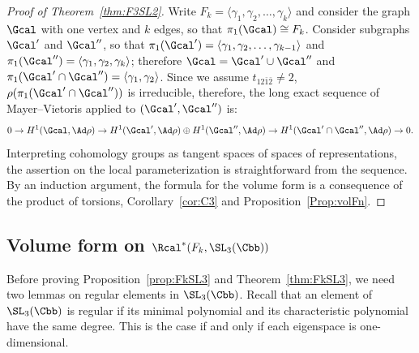 \begin{proof}[Proof of Theorem~\ref{thm:F3SL2}]
Write $F_k=\langle\gamma_1,\gamma_2,\dots,\gamma_k\rangle$ and consider the graph $\Gcal$ with one vertex and $k$ edges, so that $\pi_1(\Gcal)\cong F_k$. Consider subgraphs $\Gcal'$ and $\Gcal''$, so that $\pi_1(\Gcal')=\langle\gamma_1,\gamma_2,\dots,\gamma_{k-1}\rangle$ and $\pi_1(\Gcal'')=\langle\gamma_1,\gamma_2,\gamma_{k}\rangle$; therefore $\Gcal =\Gcal'\cup \Gcal''$ and $\pi_1(\Gcal'\cap \Gcal'')=\langle\gamma_1,\gamma_2\rangle$. Since we assume $t_{12\bar 1\bar 2}\neq 2$, $\rho(\pi_1 (\Gcal'\cap \Gcal''))$ is irreducible, therefore, the long exact sequence of Mayer--Vietoris applied to $(\Gcal', \Gcal'') $ is:
\begin{equation}
0 \to H^1(\Gcal,\Ad\rho)\to H^1(\Gcal',\Ad\rho)\oplus H^1(\Gcal'',\Ad\rho)\to H^1(\Gcal'\cap \Gcal'',\Ad\rho)\to 0.
\end{equation}
Interpreting cohomology groups as tangent spaces of spaces of representations, the assertion on the local parameterization is straightforward from the sequence. By an induction argument, the formula for the volume form is a consequence of the product of torsions, Corollary~\ref{cor:C3} and Proposition~\ref{Prop:volFn}.
\end{proof}



\subsection{Volume form on \texorpdfstring{$\Rcal^*(F_k,\SL_3(\Cbb))$}{R*(Fk, SL3(CC))}}

Before proving Proposition~\ref{prop:FkSL3} and Theorem~\ref{thm:FkSL3}, we need two lemmas on regular elements in $\SL_3(\Cbb)$. Recall that an element of $\SL_3(\Cbb)$ is regular if its minimal polynomial and its characteristic polynomial have the same degree. This is the case if and only if each eigenspace is one-dimensional.


